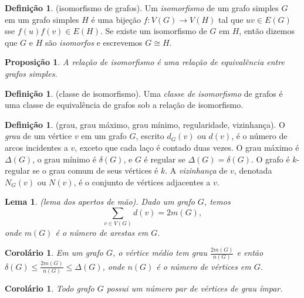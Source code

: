 \documentclass{article}
\theoremstyle{plain}
\newtheorem{prop}[thm]{Proposição}
\newtheorem{lem}[thm]{Lema}
\newtheorem{cor}[thm]{Corolário}
\theoremstyle{definition}
\newtheorem{defn}[thm]{Definição}
\theoremstyle{remark}
\begin{document}
\begin{defn} (isomorfismo de grafos).
    Um \emph{isomorfismo} de um grafo simples \(G\) em um grafo simples \(H\) é uma bijeção \(f: V(G) \to V(H)\) tal que \(uv \in E(G)\) sse \(f(u)f(v) \in E(H)\). Se existe um isomorfismo de \(G\) em \(H\), então dizemos que \(G\) e \(H\) são \emph{isomorfos} e escrevemos \(G \cong H\).
\end{defn}

\begin{prop}
    A relação de isomorfismo é uma relação de equivalência entre grafos simples.
\end{prop}

\begin{defn} (classe de isomorfismo).
    Uma \emph{classe de isomorfismo} de grafos é uma classe de equivalência de grafos sob a relação de isomorfismo.
\end{defn}

\begin{defn} (grau, grau máximo, grau mínimo, regularidade, vizinhança).
    O \emph{grau} de um vértice \(v\) em um grafo \(G\), escrito \(d_G(v)\) ou \(d(v)\), é o número de arcos incidentes a \(v\), exceto que cada laço é contado duas vezes. O grau máximo é \(\Delta(G)\), o grau mínimo é \(\delta(G)\), e \(G\) é regular se \(\Delta(G) = \delta(G)\).
    O grafo é \(k\)-regular se o grau comum de seus vértices é \(k\). A \emph{vizinhança} de \(v\), denotada \(N_G(v)\) ou \(N(v)\), é o conjunto de vértices adjacentes a \(v\).
\end{defn}

\begin{lem} (lema dos apertos de mão).
    Dado um grafo \(G\), temos 
    \begin{equation}
        \sum_{v \in V(G)} d(v) = 2 m(G),
    \end{equation}
    \noindent onde \(m(G)\) é o número de arestas em \(G\).
\end{lem}

\begin{cor}
    Em um grafo \(G\), o vértice médio tem grau \(\displaystyle \frac{2 m(G)}{n(G)}\) e então \(\delta(G) \leq \displaystyle \frac{2 m(G)}{n(G)} \leq \Delta(G)\), onde \(n(G)\) é o número de vértices em \(G\).
\end{cor}

\begin{cor}
    Todo grafo \(G\) possui um número par de vértices de grau ímpar.
\end{cor}
\end{document}
